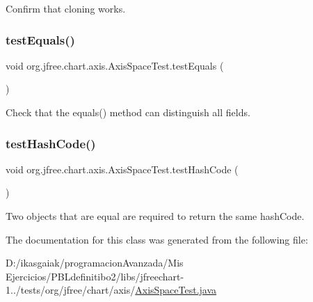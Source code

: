 Confirm that cloning works. \mbox{\label{classorg_1_1jfree_1_1chart_1_1axis_1_1_axis_space_test_a667e3d87f7e4db69a14fe3f9ed7e954e}} 
\subsubsection{\texorpdfstring{test\+Equals()}{testEquals()}}
{\footnotesize\ttfamily void org.\+jfree.\+chart.\+axis.\+Axis\+Space\+Test.\+test\+Equals (\begin{DoxyParamCaption}{ }\end{DoxyParamCaption})}

Check that the equals() method can distinguish all fields. \mbox{\label{classorg_1_1jfree_1_1chart_1_1axis_1_1_axis_space_test_aa91b48cf00e26db70968cb5ad398553b}} 
\subsubsection{\texorpdfstring{test\+Hash\+Code()}{testHashCode()}}
{\footnotesize\ttfamily void org.\+jfree.\+chart.\+axis.\+Axis\+Space\+Test.\+test\+Hash\+Code (\begin{DoxyParamCaption}{ }\end{DoxyParamCaption})}

Two objects that are equal are required to return the same hash\+Code. 

The documentation for this class was generated from the following file\+:\begin{DoxyCompactItemize}
\item 
D\+:/ikasgaiak/programacion\+Avanzada/\+Mis Ejercicios/\+P\+B\+Ldefinitibo2/libs/jfreechart-\/1../tests/org/jfree/chart/axis/\mbox{\hyperlink{_axis_space_test_8java}{Axis\+Space\+Test.\+java}}\end{DoxyCompactItemize}
